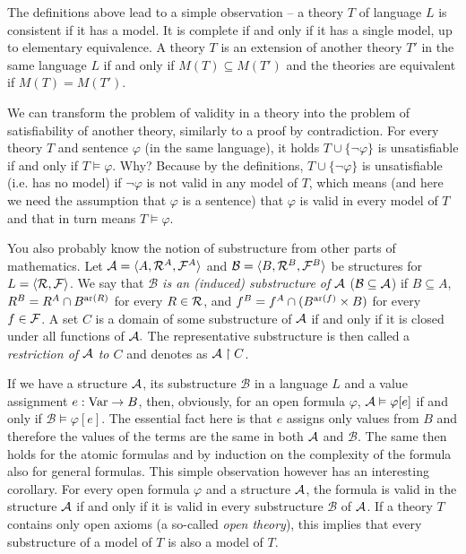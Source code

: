 The definitions above lead to a simple observation -- a theory $T$ of language $L$ is consistent if it has a model. It is complete if and only if it has a single model, up to elementary equivalence. A theory $T$ is an extension of another theory $T'$ in the same language $L$ if and only if $M(T) \subseteq M(T')$ and the theories are equivalent if $M(T) = M(T')$.

We can transform the problem of validity in a theory into the problem of satisfiability of another theory, similarly to a proof by contradiction. For every theory $T$ and sentence $\varphi$ (in the same language), it holds $T \cup \{\neg \varphi\}$ is unsatisfiable if and only if $T \vDash \varphi$. Why? Because by the definitions, $T \cup \{\neg \varphi\}$ is unsatisfiable (i.e. has no model) if $\neg \varphi$ is not valid in any model of $T$, which means (and here we need the assumption that $\varphi$ is a sentence) that $\varphi$ is valid in every model of $T$ and that in turn means $T \vDash \varphi$. 

You also probably know the notion of substructure from other parts of mathematics. Let $\mathcal{A} = \langle A, \mathcal{R}^A, \mathcal{F}^A \rangle$ and $\mathcal{B} = \langle B, \mathcal{R}^B, \mathcal{F}^B \rangle$ be structures for $L = \langle \mathcal{R}, \mathcal{F} \rangle$. We say that \emph{$\mathcal{B}$ is an (induced) substructure of $\mathcal{A}$} ($\mathcal{B} \subseteq \mathcal{A}$) if $B \subseteq A$, $R^B = R^A \cap B^{\operatorname{ar}(R)}$ for every $R \in \mathcal{R}$, and $f^B = f^A \cap (B^{\operatorname{ar}(f)}\times B)$ for every $f \in \mathcal{F}$. A set $C$ is a domain of some substructure of $\mathcal{A}$ if and only if it is closed under all functions of $\mathcal{A}.$ The representative substructure is then called a \emph{restriction of $\mathcal{A}$ to $C$} and denotes as $\mathcal{A} \upharpoonright C$.

If we have a structure $\mathcal{A}$, its substructure $\mathcal{B}$ in a language $L$ and a value assignment $e: \operatorname{Var} \to B$, then, obviously, for an open formula $\varphi$, $\mathcal{A} \vDash \varphi[e]$ if and only if $\mathcal{B} \vDash \varphi[e]$. The essential fact here is that $e$ assigns only values from $B$ and therefore the values of the terms are the same in both $\mathcal{A}$ and $\mathcal{B}$. The same then holds for the atomic formulas and by induction on the complexity of the formula also for general formulas. This simple observation however has an interesting corollary. For every open formula $\varphi$ and a structure $\mathcal{A}$, the formula is valid in the structure $\mathcal{A}$ if and only if it is valid in every substructure $\mathcal{B}$ of $\mathcal{A}$. If a theory $T$ contains only open axioms (a so-called \emph{open theory}), this implies that every substructure of a model of $T$ is also a model of $T$.

